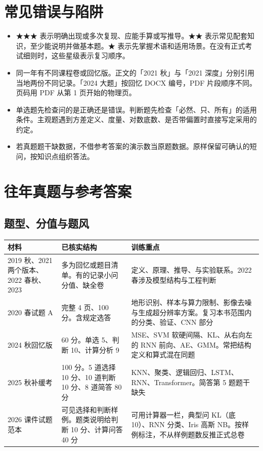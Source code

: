 \documentclass[UTF8,a4paper,zihao=-4,fontset=fandol]{ctexrep}
\begin{document}
\section{常见错误与陷阱}
\begin{itemize}
\item ★★★ 表示明确出现或多次复现、应能手算或写推导。★★ 表示常见配套知识，至少能说明并做基本题。★ 表示先掌握术语和适用场景。在没有正式考试细则时，这些星级表示复习顺序。
\item 同一年有不同课程卷或回忆版。正文的「2021 秋」与「2021 深度」分别引用当地两份不同记录。「2024 大题」按回忆 DOCX 编号，PDF 片段顺序不同。页码用 PDF 从第 1 页开始的物理页。
\item 单选题先检查问的是正确还是错误。判断题先检查「必然、只、所有」的适用条件。主观题遇到方差定义、度量、对数底数、是否带偏置时直接写定采用的约定。
\item 若真题题干缺数据，不借参考答案的演示数当原题数据。原样保留可确认的短问，按知识点组织答法。
\end{itemize}

\section{往年真题与参考答案}
\subsection{题型、分值与题风}
\begin{tabularx}{\linewidth}{@{}p{.23\linewidth}p{.24\linewidth}X@{}}
\toprule
材料 & 已核实结构 & 训练重点\\
\midrule
2019 秋、2021 两个版本、2022 春秋、2023 & 多为回忆或题目清单。有的记录小问分值、缺全卷 & 定义、原理、推导、与实验联系。2022 春涉及模型结构与工程判断\\
2020 春试题 A & 完整 4 页、100 分。含规定选答 & 地形识别、样本与算力限制、影像去噪与生成超分辨率方案。复习本书范围内的分类、验证、CNN 部分\\
2024 秋回忆版 & 60 分。单选 5、判断 10、计算分析 9 & MSE、SVM 软硬间隔、KL、从右向左的 RNN 前向、AE、GMM。常把结构定义和算式混在同题\\
2025 秋补缓考 & 100 分。5 道选择 10 分、10 道判断 10 分、8 道简答 80 分 & KNN、聚类、逻辑回归、LSTM、RNN、Transformer。简答第 5 题题干缺失\\
2026 课件试题范本 & 可见选择和判断样例。题类说明给判断 10 分、计算问答 40 分 & 可用计算器一栏，典型问 KL（底 10）、RNN 分类、Iris 高斯 NB。按样例标注，不从样例题数反推正式总卷\\
\bottomrule
\end{tabularx}
\end{document}
